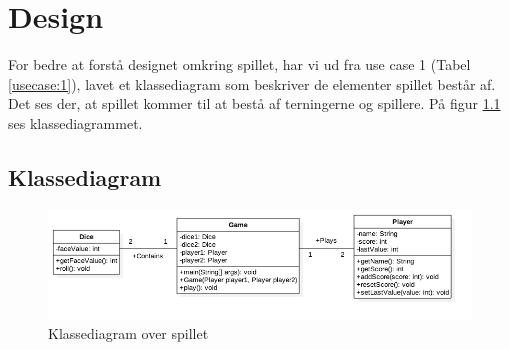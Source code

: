 \chapter{Design}

For bedre at forstå designet omkring spillet,
har vi ud fra use case 1 (Tabel \ref{usecase:1}),
lavet et klassediagram som beskriver de elementer spillet består af.
Det ses der, at spillet kommer til at bestå af terningerne og spillere.
På figur \ref{fig:klassediagram} ses klassediagrammet.

\section{Klassediagram}

\begin{figure}[h]
    \begin{center}
        \includegraphics[width=15cm]{graphics/Klassediagram}
        \caption{Klassediagram over spillet}
        \label{fig:klassediagram}
    \end{center}
\end{figure}